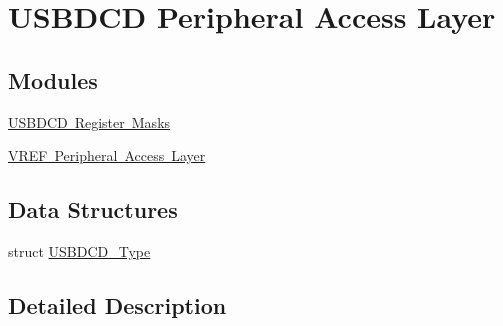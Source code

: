 \hypertarget{group___u_s_b_d_c_d___peripheral___access___layer}{}\section{U\+S\+B\+D\+CD Peripheral Access Layer}
\label{group___u_s_b_d_c_d___peripheral___access___layer}
\subsection*{Modules}
\begin{DoxyCompactItemize}
\item 
\mbox{\hyperlink{group___u_s_b_d_c_d___register___masks}{U\+S\+B\+D\+C\+D Register Masks}}
\item 
\mbox{\hyperlink{group___v_r_e_f___peripheral___access___layer}{V\+R\+E\+F Peripheral Access Layer}}
\end{DoxyCompactItemize}
\subsection*{Data Structures}
\begin{DoxyCompactItemize}
\item 
struct \mbox{\hyperlink{struct_u_s_b_d_c_d___type}{U\+S\+B\+D\+C\+D\+\_\+\+Type}}
\end{DoxyCompactItemize}


\subsection{Detailed Description}
